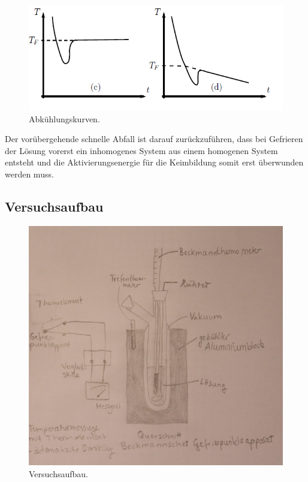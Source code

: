 \documentclass[12pt,a4paper,titlepage,headinclude,bibtotoc]{scrartcl}
\begin{document}
\begin{figure} [h!]
\begin{center}
\includegraphics[scale=0.8]{Abkuhlungskurven.png} \end{center}
\caption {Abkühlungskurven. \protect\footnotemark}
\end{figure}

Der vorübergehende schnelle Abfall ist darauf zurückzuführen, dass bei Gefrieren der Lösung vorerst ein inhomogenes System aus einem homogenen System entsteht und die Aktivierungsenergie für die Keimbildung somit erst überwunden werden muss.


\subsection{Versuchsaufbau}



\begin{figure} [h!]
\begin{center}
\includegraphics[scale=0.8]{Versuchsaufbau2.png} \end{center}
\caption{Versuchsaufbau.}
\end{figure}
\end{document}
